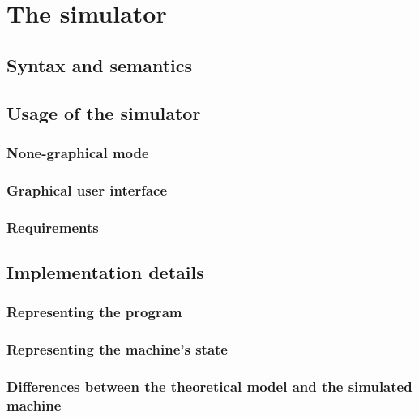 \chapter{The simulator}
\label{chap:simulator}
\section{Syntax and semantics}
\section{Usage of the simulator}
\subsection{None-graphical mode}
\subsection{Graphical user interface}
\subsection{Requirements}
\section{Implementation details}
\subsection{Representing the program}
\subsection{Representing the machine's state}
\subsection{Differences between the theoretical model and the simulated machine}
